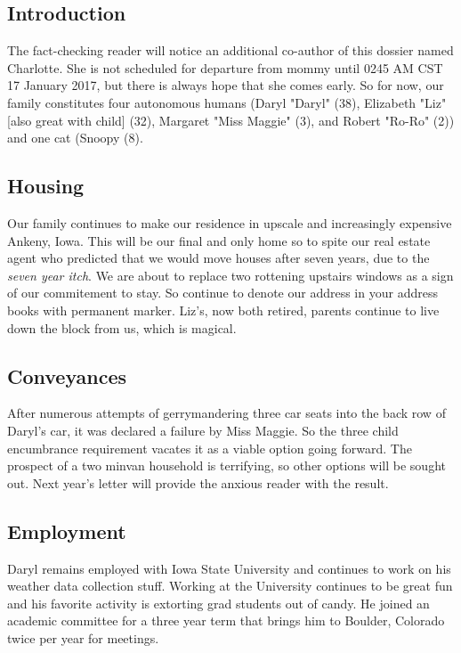 \documentclass[letterpaper,11pt]{article}
\begin{document}
\begin{multicols}{2}

\section{Introduction} 

The fact-checking reader will notice an additional co-author of this dossier
named Charlotte. She is not scheduled for departure from mommy until 0245 AM CST
17 January 2017, but there is always hope that she comes early.  So for now, our
family constitutes four autonomous humans (Daryl "Daryl" (38), Elizabeth
"Liz"[also great with child] (32), Margaret "Miss Maggie" (3), and Robert
"Ro-Ro" (2)) and one cat (Snoopy (8).

\subsection{Housing}

Our family continues to make our residence in upscale and increasingly
expensive Ankeny, Iowa.  This will be our final and only home so to spite our
real estate agent who predicted that we would move houses after seven years, due
to the \textit{seven year itch}.  We are about to replace two rottening upstairs
windows as a sign of our commitement to stay.  So continue to denote our address
in your address books with permanent marker.  Liz's, now both retired, parents
continue to live down the block from us, which is magical.

\subsection{Conveyances}

After numerous attempts of gerrymandering three car seats into the back row of
Daryl's car, it was declared a failure by Miss Maggie.  So the three child
encumbrance requirement vacates it as a viable option going forward.  The
prospect of a two minvan household is terrifying, so other options will be
sought out.  Next year's letter will provide the anxious reader with the result.

\subsection{Employment}
Daryl remains employed with Iowa State University and continues to work on 
his weather data collection stuff.  Working at the University continues to be
great fun and his favorite activity is extorting grad students out of candy. He
joined an academic committee for a three year term that brings him to Boulder, 
Colorado twice per year for meetings.


\end{multicols}
\end{document}
